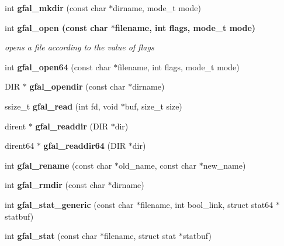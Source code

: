 \begin{CompactItemize}
\item 
int \textbf{gfal\_\-mkdir} (const char $\ast$dirname, mode\_\-t mode)\label{group__posix__group_g6f6affcf386900efc5443a9c97556a57}

\item 
int \bf{gfal\_\-open} (const char $\ast$filename, int flags, mode\_\-t mode)
\begin{CompactList}\small\item\em opens a file according to the value of flags \item\end{CompactList}\item 
int \textbf{gfal\_\-open64} (const char $\ast$filename, int flags, mode\_\-t mode)\label{group__posix__group_gbed417acea7f862ea1977417ed842ef4}

\item 
DIR $\ast$ \textbf{gfal\_\-opendir} (const char $\ast$dirname)\label{group__posix__group_g004ad5efbd544da820823e597e57be92}

\item 
ssize\_\-t \textbf{gfal\_\-read} (int fd, void $\ast$buf, size\_\-t size)\label{group__posix__group_gaa6bfe36f33b86e489b798aed96912de}

\item 
dirent $\ast$ \textbf{gfal\_\-readdir} (DIR $\ast$dir)\label{group__posix__group_g2a8ed205f7748d7817a18521268a1f2d}

\item 
dirent64 $\ast$ \textbf{gfal\_\-readdir64} (DIR $\ast$dir)\label{gfal__posix_8c_ad202b2730efde51021b620bce0d1683}

\item 
int \textbf{gfal\_\-rename} (const char $\ast$old\_\-name, const char $\ast$new\_\-name)\label{group__posix__group_g34dc6129530d6bf9e5836ef22c0d2792}

\item 
int \textbf{gfal\_\-rmdir} (const char $\ast$dirname)\label{group__posix__group_gcc4b6347640a722674c2d6df437490df}

\item 
int \textbf{gfal\_\-stat\_\-generic} (const char $\ast$filename, int bool\_\-link, struct stat64 $\ast$statbuf)\label{gfal__posix_8c_678840d435b1b1a34645fa21d34e1102}

\item 
int \textbf{gfal\_\-stat} (const char $\ast$filename, struct stat $\ast$statbuf)\label{group__posix__group_g1d8c86d522d5dd26ee7ddcd9c6925964}


\end{CompactItemize}
